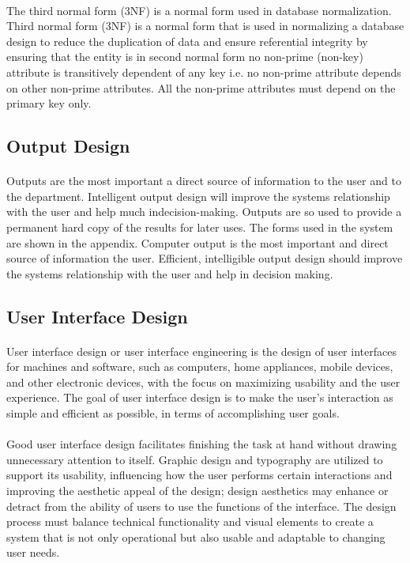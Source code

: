 \documentclass[a4paper, 12pt]{report}
\begin{document}
\paragraph{}
The third normal form (3NF) is a normal form used in database normalization. Third normal form
(3NF) is a normal form that is used in normalizing a database design to reduce the duplication of
data and ensure referential integrity by ensuring that the entity is in second normal form no non-prime
(non-key) attribute is transitively dependent of any key i.e. no non-prime attribute depends on other
non-prime attributes. All the non-prime attributes must depend on the primary key only.
\fontsize{14pt}{14pt}\selectfont
\subsection{Output Design}
\fontsize{12pt}{12pt}\selectfont
\paragraph{}
Outputs are the most important a direct source of information to the user and to the department. Intelligent output design will improve the systems relationship with the user and help much indecision-making. Outputs are so used to provide a permanent hard copy of the results for later uses. The forms used in the system are shown in the appendix. Computer output is the most important and direct source of information the user. Efficient, intelligible output design should improve the systems relationship with the user and help in decision making.

\fontsize{14pt}{14pt}\selectfont
\subsection{User Interface Design}
\fontsize{12pt}{12pt}\selectfont
\paragraph{}
User interface design or user interface engineering is the design of user interfaces for machines and software, such as computers, home appliances, mobile devices, and other electronic devices, with the focus on maximizing usability and the user experience. The goal of user interface design is to make the user's interaction as simple and efficient as possible, in terms of accomplishing user goals.
\paragraph{}
Good user interface design facilitates finishing the task at hand without drawing unnecessary attention to itself. Graphic design and typography are utilized to support its usability, influencing how the user performs certain interactions and improving the aesthetic appeal of the design; design aesthetics may enhance or detract from the ability of users to use the functions of the interface. The design process must balance technical functionality and visual elements to create a system that is not only operational but also usable and adaptable to changing user needs.
\end{document}
